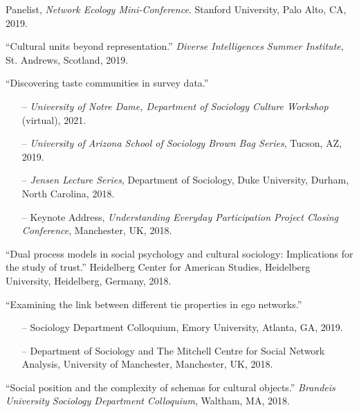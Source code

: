 \ind Panelist, \emph{Network Ecology Mini-Conference}. Stanford University, Palo Alto, CA, 2019.

\ind ``Cultural units beyond representation.'' {\em Diverse Intelligences Summer Institute}, St. Andrews, Scotland, 2019.

\ind ``Discovering taste communities in survey data.''

\begin{itemize}[leftmargin=0.8in, topsep = 0pt]
	\setlength\itemsep{-0.55em}
	\item[--] {\em University of Notre Dame, Department of Sociology Culture Workshop} (virtual), 2021.
	\item[--] {\em University of Arizona School of Sociology Brown Bag Series},  Tucson, AZ, 2019. 
    \item[--]{\em Jensen Lecture Series}, Department of Sociology, Duke University, Durham, North Carolina, 2018.
    \item[--]Keynote Address, {\em Understanding Everyday Participation Project Closing Conference}, Manchester, UK, 2018.
\end{itemize}

\ind ``Dual process models in social psychology and cultural sociology: Implications for the study of trust.'' Heidelberg Center for American Studies, Heidelberg University, Heidelberg, Germany, 2018. 

\ind ``Examining the link between different tie properties in ego networks.'' 
    \begin{itemize}[leftmargin=0.8in, topsep = 0pt]
    \setlength\itemsep{-0.55em}
    \item[--] Sociology Department Colloquium, Emory University, Atlanta, GA, 2019.
	\item[--] Department of Sociology and The Mitchell Centre for Social Network Analysis, University of Manchester, Manchester, UK, 2018.
\end{itemize}

\ind ``Social position and the complexity of schemas for cultural objects.'' {\em Brandeis University Sociology Department Colloquium}, Waltham, MA, 2018.



